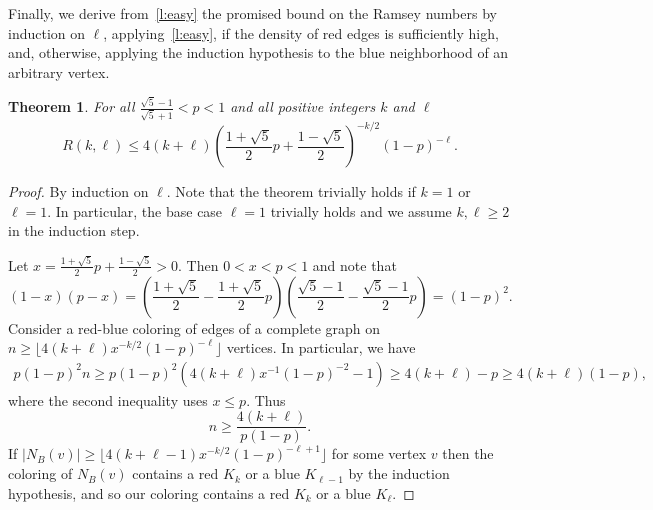 \documentclass[reqno,final,12pt]{amsart}
\newtheorem{thm}{Theorem}
\newcommand{\s}[1]{\left(#1\right)}
\begin{document}
Finally, we derive from~\cref{l:easy} the promised bound on the Ramsey numbers by induction on $\ell$, applying~\cref{l:easy}, if the density of red edges is sufficiently high, and, otherwise, applying the induction hypothesis to the blue neighborhood of an arbitrary vertex.  

\begin{thm}\label{t:easy}
	For all $\frac{\sqrt{5}-1}{\sqrt{5}+1}< p <1$ and all positive integers $k$ and  $\ell$ $$R(k,\ell) \leq 4(k+\ell)\s{\frac{1+\sqrt{5}}{2}p+\frac{1-\sqrt{5}}{2}}^{-k/2}(1-p)^{-\ell} .$$
\end{thm}
\begin{proof}
	By induction on $\ell$. Note that the theorem trivially holds if $k=1$ or $\ell =1 $. In particular, the base case $\ell=1$ trivially holds and we assume $k, \ell \geq 2$ in the induction step.
	
	Let $x = \frac{1+\sqrt{5}}{2}p+\frac{1-\sqrt{5}}{2} >0$. Then $0<x<p<1$ and note that 	\begin{equation}\label{e:PEquation}
(1-x)(p-x) = \s{\frac{1+\sqrt{5}}{2}-\frac{1+\sqrt{5}}{2}p}\s{\frac{\sqrt{5}-1}{2}-\frac{\sqrt{5}-1}{2}p}=(1-p)^2.
	\end{equation} Consider a red-blue coloring of edges of a complete graph on $n \geq \lfloor 4(k+\ell)x^{-k/2}(1-p)^{-\ell} \rfloor$ vertices. 
	In particular, we have \begin{align*} p(1-p)^2n \geq  p(1-p)^2 \s{4(k+ \ell)x^{-1} (1-p)^{-2} - 1}   \geq  4(k+\ell) - p \geq 4(k+\ell)(1-p),\end{align*}
	where the second inequality uses $x \leq p$.
	Thus 
	\begin{equation}\label{e:nLower} 
		n \geq \frac{4(k + \ell)}{p(1-p)}.
	\end{equation} 
	 If $|N_B(v)|\geq  \lfloor 4(k+\ell-1)x^{-k/2}(1-p)^{-\ell+1} \rfloor$ for some vertex $v$ then the coloring of $N_B(v)$ contains a red $K_k$ or a blue $K_{\ell-1}$ by the induction hypothesis, and so our coloring contains a red $K_k$ or a blue $K_\ell$. 
	 

\end{proof}
\end{document}
